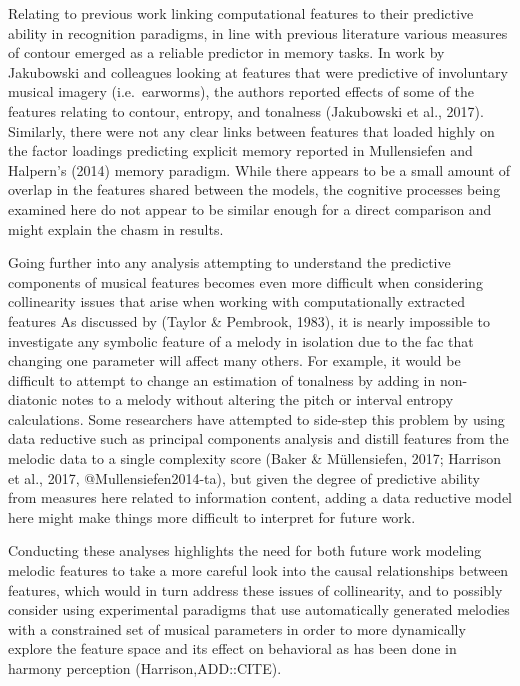 \documentclass[english,man]{apa6}
\begin{document}
Relating to previous work linking computational features to their predictive ability in recognition paradigms, in line with previous literature various measures of contour emerged as a reliable predictor in memory tasks.
In work by Jakubowski and colleagues looking at features that were predictive of involuntary musical imagery (i.e.~earworms), the authors reported effects of some of the features relating to contour, entropy, and tonalness (Jakubowski et al., 2017).
Similarly, there were not any clear links between features that loaded highly on the factor loadings predicting explicit memory reported in Mullensiefen and Halpern's (2014) memory paradigm.
While there appears to be a small amount of overlap in the features shared between the models, the cognitive processes being examined here do not appear to be similar enough for a direct comparison and might explain the chasm in results.

Going further into any analysis attempting to understand the predictive components of musical features becomes even more difficult when considering collinearity issues that arise when working with computationally extracted features As discussed by (Taylor \& Pembrook, 1983), it is nearly impossible to investigate any symbolic feature of a melody in isolation due to the fac that changing one parameter will affect many others.
For example, it would be difficult to attempt to change an estimation of tonalness by adding in non-diatonic notes to a melody without altering the pitch or interval entropy calculations. Some researchers have attempted to side-step this problem by using data reductive such as principal components analysis and distill features from the melodic data to a single complexity score (Baker \& Müllensiefen, 2017; Harrison et al., 2017, @Mullensiefen2014-ta), but given the degree of predictive ability from measures here related to information content, adding a data reductive model here might make things more difficult to interpret for future work.

Conducting these analyses highlights the need for both future work modeling melodic features to take a more careful look into the causal relationships between features, which would in turn address these issues of collinearity, and to possibly consider using experimental paradigms that use automatically generated melodies with a constrained set of musical parameters in order to more dynamically explore the feature space and its effect on behavioral as has been done in harmony perception (Harrison,ADD::CITE).
\end{document}
